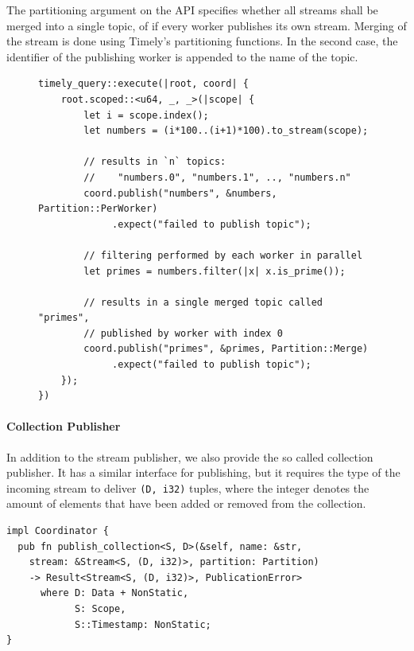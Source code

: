 The partitioning argument on the API specifies whether all streams
shall be merged into a single topic, of if every worker publishes its own stream.
Merging of the stream is done using Timely's partitioning functions. 
In the second case, the identifier of the publishing worker is appended to the
name of the topic. 

\vspace{5em}

\begin{figure}[h!]
\begin{lstlisting}[caption={
Example how topics can be published in partitions. 
}]
timely_query::execute(|root, coord| {
    root.scoped::<u64, _, _>(|scope| {
        let i = scope.index();
        let numbers = (i*100..(i+1)*100).to_stream(scope);

        // results in `n` topics:
        //    "numbers.0", "numbers.1", .., "numbers.n"
        coord.publish("numbers", &numbers, Partition::PerWorker)
             .expect("failed to publish topic");

        // filtering performed by each worker in parallel
        let primes = numbers.filter(|x| x.is_prime());

        // results in a single merged topic called "primes",
        // published by worker with index 0
        coord.publish("primes", &primes, Partition::Merge)
             .expect("failed to publish topic");
    });
})
\end{lstlisting}
\end{figure}

\paragraph{Collection Publisher}

In addition to the stream publisher, we also provide the so called collection
publisher. It has a similar interface for publishing, but it requires the
type of the incoming stream to deliver \lstinline{(D, i32)} tuples, where
the integer denotes the amount of elements that have been added or removed from
the collection.

\begin{lstlisting}[caption={[Collection publisher interface]
}]
impl Coordinator {
  pub fn publish_collection<S, D>(&self, name: &str,
    stream: &Stream<S, (D, i32)>, partition: Partition)
    -> Result<Stream<S, (D, i32)>, PublicationError>
      where D: Data + NonStatic, 
            S: Scope,
            S::Timestamp: NonStatic;
}
\end{lstlisting}


